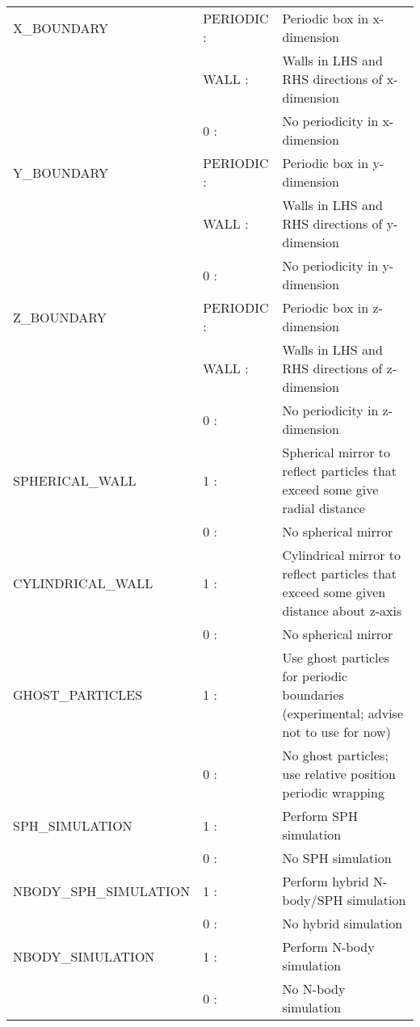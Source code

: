 \documentclass[a4paper]{article}
\begin{document}
\begin{center}
\begin{supertabular}{|p{4.6cm}|p{4.6cm} p{6.4cm}|}
 X\_BOUNDARY   & PERIODIC :& Periodic box in x-dimension  \\
               & WALL     :& Walls in LHS and RHS directions of x-dimension \\
               & 0        :& No periodicity in x-dimension \\ \hline

 Y\_BOUNDARY   & PERIODIC :& Periodic box in y-dimension \\
               & WALL     :& Walls in LHS and RHS directions of y-dimension \\
               & 0        :& No periodicity in y-dimension \\ \hline

 Z\_BOUNDARY   & PERIODIC :& Periodic box in z-dimension \\
               & WALL     :& Walls in LHS and RHS directions of z-dimension \\
               & 0        :& No periodicity in z-dimension \\ \hline

 SPHERICAL\_WALL & 1 :& Spherical mirror to reflect particles that exceed some give radial distance \\
                   & 0 :& No spherical mirror \\ \hline

 CYLINDRICAL\_WALL & 1 :& Cylindrical mirror to reflect particles that exceed some given distance about z-axis \\
                   & 0 :& No spherical mirror \\ \hline

 GHOST\_PARTICLES       & 1 :& Use ghost particles for periodic boundaries (experimental; advise not to use for now) \\
                        & 0 :& No ghost particles; use relative position periodic wrapping \\ \hline

 SPH\_SIMULATION        & 1 :& Perform SPH simulation \\
                        & 0 :& No SPH simulation \\ \hline

 NBODY\_SPH\_SIMULATION & 1 :& Perform hybrid N-body/SPH simulation \\
                        & 0 :& No hybrid simulation \\ \hline

 NBODY\_SIMULATION      & 1 :& Perform N-body simulation \\
                        & 0 :& No N-body simulation \\ \hline


\end{supertabular}
\end{center}
\end{document}
